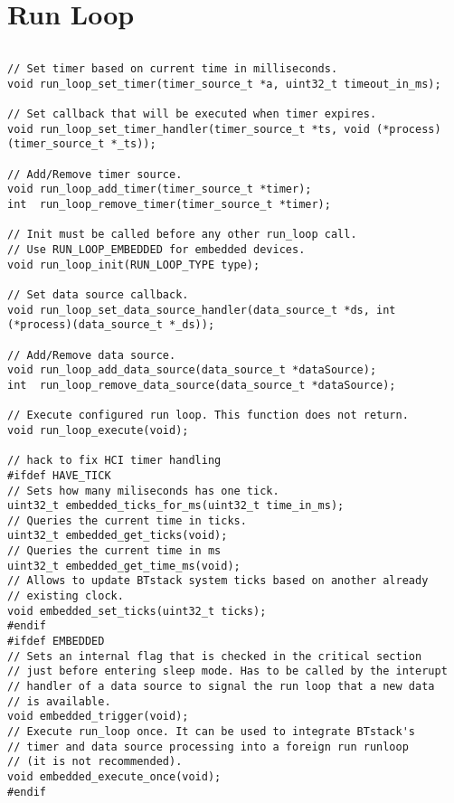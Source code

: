\section{Run Loop}
\label{appendix:api_run_loop}
$ $
\begin{lstlisting}
// Set timer based on current time in milliseconds.
void run_loop_set_timer(timer_source_t *a, uint32_t timeout_in_ms);

// Set callback that will be executed when timer expires.
void run_loop_set_timer_handler(timer_source_t *ts, void (*process)(timer_source_t *_ts));

// Add/Remove timer source.
void run_loop_add_timer(timer_source_t *timer); 
int  run_loop_remove_timer(timer_source_t *timer);

// Init must be called before any other run_loop call. 
// Use RUN_LOOP_EMBEDDED for embedded devices.
void run_loop_init(RUN_LOOP_TYPE type);

// Set data source callback.
void run_loop_set_data_source_handler(data_source_t *ds, int (*process)(data_source_t *_ds));

// Add/Remove data source.
void run_loop_add_data_source(data_source_t *dataSource);
int  run_loop_remove_data_source(data_source_t *dataSource);

// Execute configured run loop. This function does not return.
void run_loop_execute(void);

// hack to fix HCI timer handling
#ifdef HAVE_TICK
// Sets how many miliseconds has one tick.
uint32_t embedded_ticks_for_ms(uint32_t time_in_ms);
// Queries the current time in ticks.
uint32_t embedded_get_ticks(void);
// Queries the current time in ms
uint32_t embedded_get_time_ms(void);
// Allows to update BTstack system ticks based on another already 
// existing clock.
void embedded_set_ticks(uint32_t ticks);
#endif
#ifdef EMBEDDED
// Sets an internal flag that is checked in the critical section
// just before entering sleep mode. Has to be called by the interupt
// handler of a data source to signal the run loop that a new data 
// is available.
void embedded_trigger(void);    
// Execute run_loop once. It can be used to integrate BTstack's 
// timer and data source processing into a foreign run runloop 
// (it is not recommended).
void embedded_execute_once(void);
#endif
\end{lstlisting}
\pagebreak
